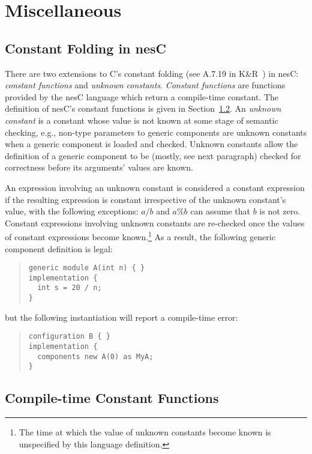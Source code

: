 \documentclass[11pt,letterpaper]{article}
\newcommand{\nesc}{nesC\xspace}
\begin{document}
\section{Miscellaneous}
\label{sec:misc}

\subsection{Constant Folding in \nesc}
\label{sec:constant-folding}

There are two extensions to C's constant folding (see A.7.19 in
K\&R~\cite{kandr}) in \nesc: \emph{constant functions} and \emph{unknown
constants}. \emph{Constant functions} are functions provided by the \nesc
language which return a compile-time constant. The definition of \nesc's
constant functions is given in Section~\ref{sec:constant-functions}. An
\emph{unknown constant} is a constant whose value is not known at some
stage of semantic checking, e.g., non-type parameters to generic components
are unknown constants when a generic component is loaded and
checked. Unknown constants allow the definition of a generic component to
be (mostly, see next paragraph) checked for correctness before its
arguments' values are known.

An expression involving an unknown constant is considered a constant
expression if the resulting expression is constant irrespective of the
unknown constant's value, with the following exceptions: $a / b$ and $a \%
b$ can assume that $b$ is not zero. Constant expressions involving unknown
constants are re-checked once the values of constant expressions become
known.\footnote{The time at which the value of unknown constants become
known is unspecified by this language definition.} As a result, the
following generic component definition is legal:
\begin{quote}
\begin{verbatim}
generic module A(int n) { }
implementation {
  int s = 20 / n;
}
\end{verbatim}
\end{quote}
but the following instantiation will report a compile-time error:
\begin{quote}
\begin{verbatim}
configuration B { }
implementation {
  components new A(0) as MyA;
}
\end{verbatim}
\end{quote}

\subsection{Compile-time Constant Functions}
\label{sec:constant-functions}
\end{document}
